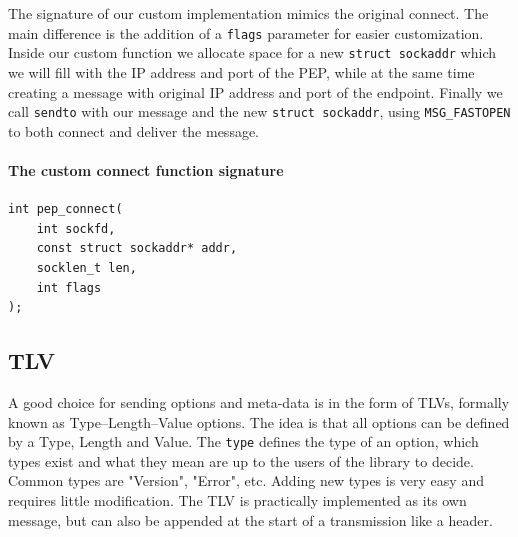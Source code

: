 \documentclass[a4paper,english, 11pt]{report}
\begin{document}
The signature of our custom implementation mimics the original connect. The main difference is the addition of a \verb|flags| parameter for easier customization. Inside our custom function we allocate space for a new \verb|struct sockaddr| which we will fill with the IP address and port of the PEP, while at the same time creating a message with original IP address and port of the endpoint. Finally we call \verb|sendto| with our message and the new \verb|struct sockaddr|, using \verb|MSG_FASTOPEN| to both connect and deliver the message.\\

\noindent\begin{minipage}{\linewidth}
\paragraph{The custom connect function signature}
\begin{verbatim}
int pep_connect(
    int sockfd,
    const struct sockaddr* addr,
    socklen_t len,
    int flags
);
\end{verbatim}
\end{minipage}


%
%    
%
%    
%

\subsection{TLV}
A good choice for sending options and meta-data is in the form of TLVs, formally known as Type–Length–Value options.
The idea is that all options can be defined by a Type, Length and Value. The \verb|type| defines the type of an option, which types exist and what they mean are up to the users of the library to decide. Common types are "Version", "Error", etc. Adding new types is very easy and requires little modification. The TLV is practically implemented as its own message, but can also be appended at the start of a transmission like a header.\\
\end{document}
